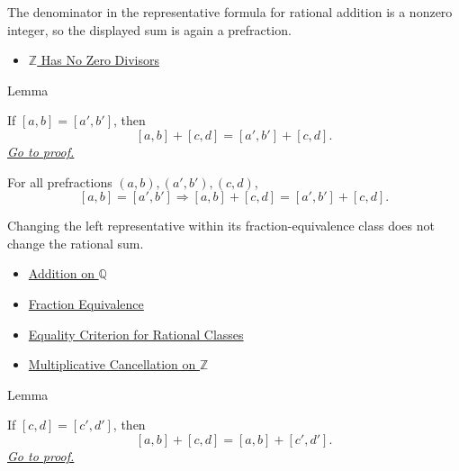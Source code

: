 \begin{remark*}[Interpretation]
The denominator in the representative formula for rational addition is a
nonzero integer, so the displayed sum is again a prefraction.
\end{remark*}

\begin{dependencies}
\begin{itemize}
  \item \hyperref[thm:z-has-no-zero-divisors]{$\mathbb{Z}$ Has No Zero Divisors}
\end{itemize}
\end{dependencies}

\begin{lemmabox}{Lemma}
\begin{lemma}
\label{lem:addition-on-q-respects-left-equivalence}
If $[a,b]=[a',b']$, then
\[
[a,b]+[c,d]=[a',b']+[c,d].
\]
\hyperref[prf:addition-on-q-respects-left-equivalence]{\textit{Go to proof.}}
\end{lemma}
\end{lemmabox}

\begin{remark*}
For all prefractions $(a,b),(a',b'),(c,d)$,
\[
[a,b]=[a',b']
\Longrightarrow
[a,b]+[c,d]=[a',b']+[c,d].
\]
\end{remark*}

\begin{remark*}[Interpretation]
Changing the left representative within its fraction-equivalence class does
not change the rational sum.
\end{remark*}

\begin{dependencies}
\begin{itemize}
  \item \hyperref[def:addition-on-q-classes]{Addition on $\mathbb{Q}$}
  \item \hyperref[def:fraction-equivalence]{Fraction Equivalence}
  \item \hyperref[prop:equality-criterion-for-rational-classes]{Equality Criterion for Rational Classes}
  \item \hyperref[cor:multiplicative-cancellation-on-z]{Multiplicative Cancellation on $\mathbb{Z}$}
\end{itemize}
\end{dependencies}

\begin{lemmabox}{Lemma}
\begin{lemma}
\label{lem:addition-on-q-respects-right-equivalence}
If $[c,d]=[c',d']$, then
\[
[a,b]+[c,d]=[a,b]+[c',d'].
\]
\hyperref[prf:addition-on-q-respects-right-equivalence]{\textit{Go to proof.}}
\end{lemma}
\end{lemmabox}

